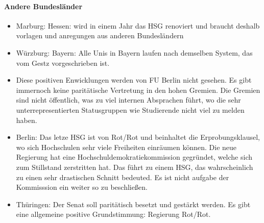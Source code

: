     \paragraph{Andere Bundesländer}
      \begin{itemize}
        \item Marburg: Hessen: wird in einem Jahr das HSG renoviert und braucht deshalb vorlagen und anregungen aus anderen Bundesländern
        \item Würzburg: Bayern: Alle Unis in Bayern laufen nach demselben System, das vom Gestz vorgeschrieben ist. 
        \item Diese positiven Enwicklungen werden von FU Berlin nicht gesehen. Es gibt immernoch keine paritätische Vertretung in den hohen Gremien. Die Gremien sind nicht öffentlich, was zu viel internen Absprachen führt, wo die sehr unterrepresentierten Statusgruppen wie Studierende nicht viel zu melden haben.
        \item Berlin: Das letze HSG ist von Rot/Rot und beinhaltet die Erprobungsklausel, wo sich Hochschulen sehr viele Freiheiten einräumen können. Die neue Regierung hat eine Hochschuldemokratiekommission gegründet, welche sich zum Stillstand zerstritten hat. Das führt zu einem HSG, das wahrscheinlich zu einen sehr drastischen Schnitt bedeuted. Es ist nicht aufgabe der Kommisssion ein weiter so zu beschließen.
        \item Thüringen: Der Senat soll paritätisch besetzt und gestärkt werden. Es gibt eine allgemeine positive Grundstimmung: Regierung Rot/Rot.
      \end{itemize}


